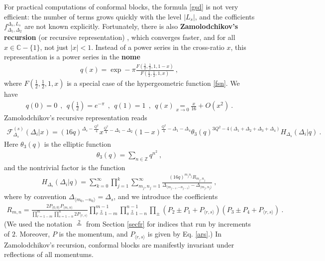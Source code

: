\documentclass[12pt, a4paper, notitlepage, twoside]{report}
\numberwithin{equation}{section}
\theoremstyle{break}
\begin{document}
For practical computations of conformal blocks, the formula \eqref{gsd} is not very efficient: the number of terms grows quickly with the level $|L_s|$, and the cofficients $f_{\Delta_1,\Delta_2}^{\Delta_s,L_s}$ are not known explicitly.
Fortunately, there is also
\textbf{Zamolodchikov's recursion} (or recursive representation) \cite{zz90}, which converges faster, and for all $x\in\mathbb{C}-\{1\}$, not just $|x|<1$.
Instead of a power series in the cross-ratio $x$, this representation is a power series in the \textbf{nome}
\begin{align}
 q(x) = \exp -\pi \frac{F(\frac12,\frac12,1,1-x)}{F(\frac12,\frac12,1,x)}  \ , 
\end{align}
where $F(\frac12,\frac12,1,x)$ is a special case of the hypergeometric function \eqref{fsn}. 
We have 
\begin{align}
 q(0)=0 \ \ , \ \ q(\tfrac12) = e^{-\pi} \ \ , \ \ q(1)=1 \ \ , \ \ q(x)\underset{x\to 0}{=} \frac{x}{16} +O(x^2)\ .
\end{align}
Zamolodchikov's recursive representation reads 
\begin{align}
 \mathcal{F}^{(s)}_{\Delta_s}(\Delta_i|x) 
=  (16q)^{\Delta_s -\frac{Q^2}{4}} x^{\frac{Q^2}{4}-\Delta_1-\Delta_2} (1-x)^{\frac{Q^2}{4}-\Delta_1-\Delta_4} \theta_3(q)^{3Q^2-4(\Delta_1+\Delta_2+\Delta_3+\Delta_4)} H_{\Delta_s}(\Delta_i|q)\ .
\end{align}
Here $\theta_3(q)$ is the elliptic function
\begin{align}
 \theta_3(q) = \sum_{n\in{\mathbb{Z}}} q^{n^2}\ ,
\end{align}
 and the nontrivial factor is the function
\begin{align}
 H_{\Delta_s}(\Delta_i|q) = \sum_{k=0}^\infty \prod_{j=1}^k \sum_{m_j,n_j=1}^\infty \frac{(16q)^{m_jn_j}R_{m_j,n_j}}{\Delta_{\langle m_{j-1},-n_{j-1} \rangle}-\Delta_{\langle m_j,n_j\rangle}}\ ,
\label{hdq}
\end{align}
where by convention $\Delta_{\langle m_0,-n_0\rangle} = \Delta_s$, and we introduce the coefficients
\begin{align}
 R_{m,n} = \frac{2P_{\langle 0,0\rangle} P_{\langle m,n\rangle}}{\prod_{r=1-m}^m \prod_{s=1-n}^n 2P_{\langle r,s\rangle}}
\prod_{r\overset{2}{=}1-m}^{m-1} \prod_{s\overset{2}{=}1-n}^{n-1} \prod_\pm (P_2\pm P_1 + P_{\langle r,s\rangle}) (P_3\pm P_4 +P_{\langle r,s\rangle})\ .
\end{align}
(We used the notation $\overset{2}{=}$ from Section \ref{secfr} for indices that run by increments of $2$.
Moreover, $P$ is the momentum, and $P_{\langle r,s \rangle}$ is given by Eq. \eqref{ars}.) In Zamolodchikov's  recursion, conformal blocks are manifestly invariant under reflections of all momentums.
\end{document}
